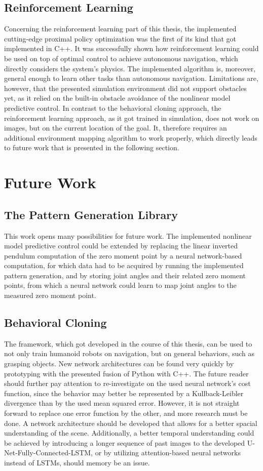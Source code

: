 \subsection{Reinforcement Learning}
Concerning the reinforcement learning part of this thesis, the implemented cutting-edge proximal policy optimization was the first of its kind that got implemented in C++. It was successfully shown how reinforcement learning could be used on top of optimal control to achieve autonomous navigation, which directly considers the system's physics. The implemented algorithm is, moreover, general enough to learn other tasks than autonomous navigation. Limitations are, however, that the presented simulation environment did not support obstacles yet, as it relied on the built-in obstacle avoidance of the nonlinear model predictive control. In contrast to the behavioral cloning approach, the reinforcement learning approach, as it got trained in simulation, does not work on images, but on the current location of the goal. It, therefore requires an additional environment mapping algorithm to work properly, which directly leads to future work that is presented in the following section.
\section{Future Work}
\subsection{The Pattern Generation Library}
This work opens many possibilities for future work. The implemented nonlinear model predictive control could be extended by replacing the linear inverted pendulum computation of the zero moment point by a neural network-based computation, for which data had to be acquired by running the implemented pattern generation, and by storing joint angles and their related zero moment points, from which a neural network could learn to map joint angles to the measured zero moment point. 
\subsection{Behavioral Cloning}
The framework, which got developed in the course of this thesis, can be used to not only train humanoid robots on navigation, but on general behaviors, such as grasping objects. New network architectures can be found very quickly by prototyping with the presented fusion of Python with C++. The future reader should further pay attention to re-investigate on the used neural network's cost function, since the behavior may better be represented by a Kullback-Leibler divergence than by the used mean squared error. However, it is not straight forward to replace one error function by the other, and more research must be done. A network architecture should be developed that allows for a better spacial understanding of the scene. Additionally, a better temporal understanding could be achieved by introducing a longer sequence of past images to the developed U-Net-Fully-Connected-LSTM, or by utilizing attention-based neural networks instead of LSTMs, should memory be an issue. 
